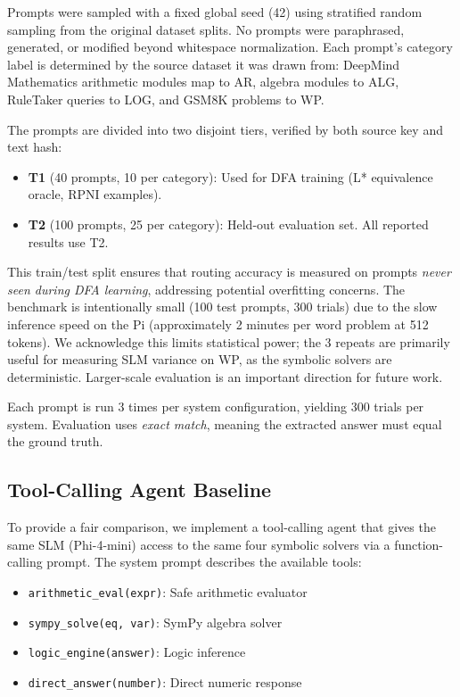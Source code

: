 \documentclass[journal]{IEEEtai}
\begin{document}
Prompts were sampled with a fixed global seed (42) using stratified random sampling from the original dataset splits. No prompts were paraphrased, generated, or modified beyond whitespace normalization. Each prompt's category label is determined by the source dataset it was drawn from: DeepMind Mathematics arithmetic modules map to AR, algebra modules to ALG, RuleTaker queries to LOG, and GSM8K problems to WP.

The prompts are divided into two disjoint tiers, verified by both source key and text hash:
\begin{itemize}
    \item \textbf{T1} (40 prompts, 10 per category): Used for DFA training (L* equivalence oracle, RPNI examples).
    \item \textbf{T2} (100 prompts, 25 per category): Held-out evaluation set. All reported results use T2.
\end{itemize}

This train/test split ensures that routing accuracy is measured on prompts \emph{never seen during DFA learning}, addressing potential overfitting concerns. The benchmark is intentionally small (100 test prompts, 300 trials) due to the slow inference speed on the Pi (approximately 2 minutes per word problem at 512 tokens). We acknowledge this limits statistical power; the 3 repeats are primarily useful for measuring SLM variance on WP, as the symbolic solvers are deterministic. Larger-scale evaluation is an important direction for future work.

Each prompt is run 3 times per system configuration, yielding 300 trials per system. Evaluation uses \textit{exact match}, meaning the extracted answer must equal the ground truth.

\subsection{Tool-Calling Agent Baseline}
\label{sec:agent_baseline}

To provide a fair comparison, we implement a tool-calling agent that gives the same SLM (Phi-4-mini) access to the same four symbolic solvers via a function-calling prompt. The system prompt describes the available tools:
\begin{itemize}
    \item \texttt{arithmetic\_eval(expr)}: Safe arithmetic evaluator
    \item \texttt{sympy\_solve(eq, var)}: SymPy algebra solver
    \item \texttt{logic\_engine(answer)}: Logic inference
    \item \texttt{direct\_answer(number)}: Direct numeric response
\end{itemize}
\end{document}
